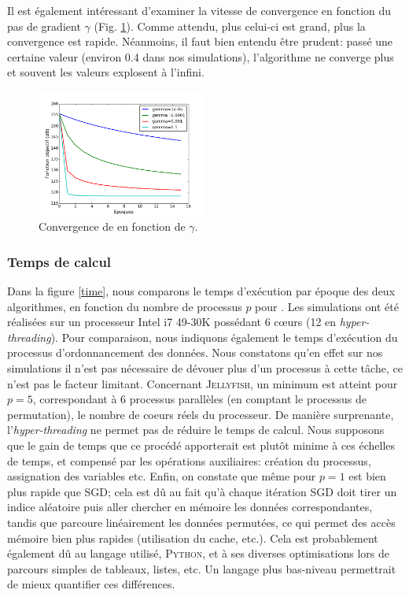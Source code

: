 \documentclass[10pt,a4paper]{article}
\begin{document}
Il est également intéressant d'examiner la vitesse de convergence en fonction du pas de gradient $\gamma$ (Fig. \ref{obj_gamma}). Comme attendu, plus celui-ci est grand, plus la convergence est rapide. Néanmoins, il faut bien entendu être prudent: passé une certaine valeur (environ 0.4 dans nos simulations), l'algorithme ne converge plus et souvent les valeurs explosent à l'infini.

\begin{figure}[h]
\centering
\includegraphics[width=0.5\textwidth]{fig/obj_gamma}
\caption{Convergence de \jel en fonction de $\gamma$.}
\label{obj_gamma}
\end{figure}

\subsubsection*{Temps de calcul}
Dans la figure \ref{time}, nous comparons le temps d'exécution par époque des deux algorithmes, en fonction du nombre de processus $p$ pour \jel. Les simulations ont été réalisées sur un processeur Intel i7 49-30K possédant 6 cœurs (12 en \emph{hyper-threading}). Pour comparaison, nous indiquons également le temps d'exécution du processus d'ordonnancement des données. Nous constatons qu'en effet sur nos simulations il n'est pas nécessaire de dévouer plus d'un processus à cette tâche, ce n'est pas le facteur limitant. Concernant \textsc{Jellyfish}, un minimum est atteint pour $p=5$, correspondant à $6$ processus parallèles (en comptant le processus de permutation), le nombre de coeurs réels du processeur. De manière surprenante, l'\emph{hyper-threading} ne permet pas de réduire le temps de calcul. Nous supposons que le gain de temps que ce procédé apporterait est plutôt minime à ces échelles de temps, et compensé par les opérations auxiliaires: création du processus, assignation des variables etc. Enfin, on constate que même pour $p=1$ \jel est bien plus rapide que SGD; cela est dû au fait qu'à chaque itération SGD doit tirer un indice aléatoire puis aller chercher en mémoire les données correspondantes, tandis que \jel parcoure linéairement les données permutées, ce qui permet des accès mémoire bien plus rapides (utilisation du cache, etc.). Cela est probablement également dû au langage utilisé, \textsc{Python}, et à ses diverses optimisations lors de parcours simples de tableaux, listes, etc. Un langage plus bas-niveau permettrait de mieux quantifier ces différences.
\end{document}
